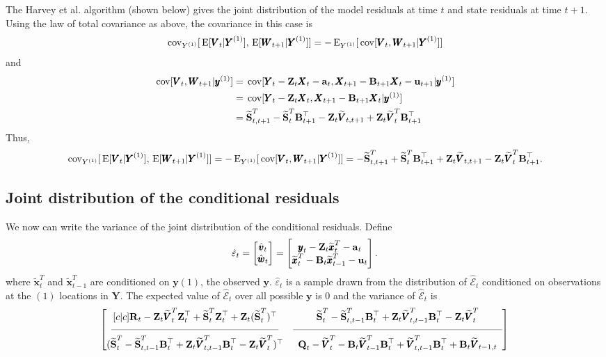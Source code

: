 \documentclass[]{article}
\def\UPS{\mbox{\boldmath $\Upsilon$}}
\def\XI{\mbox{\boldmath $\Xi$}}
\def\BB{\mbox{$\mathbf B$}}	\def\bb{\mbox{$\mathbf b$}} \def\Bb{\mbox{$\mathbf J$}} \def\Ba{\mbox{$\mathbf L$}} \def\Bm{\UPS}
\def\E{\,\textup{\textrm{E}}}
\def\QQ{\mbox{$\mathbf Q$}}	 \def\qq{\mbox{$\mathbf q$}} \def\Qb{\mbox{$\mathbf G$}}  \def\Qm{\mathbb{Q}}
\def\RR{\mbox{$\mathbf R$}}	 \def\rr{\mbox{$\mathbf r$}} \def\Rb{\mbox{$\mathbf H$}}	\def\Rm{\mathbb{R}}
\def\Ss{\mbox{$\mathbf S$}}
\def\VV{\mbox{$\pmb{V}$}}	\def\vv{\mbox{$\pmb{v}$}}
\def\WW{\mbox{$\pmb{W}$}}	\def\ww{\mbox{$\pmb{w}$}}
\def\XX{\mbox{$\pmb{X}$}}	\def\xx{\mbox{$\pmb{x}$}}
\def\YY{\mbox{$\pmb{Y}$}}	\def\yy{\mbox{$\pmb{y}$}}
\def\ZZ{\mbox{$\mathbf Z$}}	\def\zz{\mbox{$\mathbf z$}}	\def\Zb{\mbox{$\mathbf M$}} \def\Za{\mbox{$\mathbf N$}} \def\Zm{\XI}
\def\cov{\,\textup{\textrm{cov}}}
\def\hatxt{\widetilde{\xx}_t^T}
\def\hatxtm{\widetilde{\mbox{$\xx$}}_{t-1}^T}
\def\hatVt{\widetilde{\VV}_t^T}
\def\hatVtm{\widetilde{\VV}_{t-1}^T}
\def\hatVttm{\widetilde{\VV}_{t,t-1}^T}
\def\hatSt{\widetilde{\Ss}_t^T}
\def\hatSttm{\widetilde{\Ss}_t^{t-1}}
\def\hatSttm{\widetilde{\Ss}_{t,t-1}^T}
\def\hatSttp{\widetilde{\Ss}_{t,t+1}^T}
\begin{document}
The Harvey et al. algorithm (shown below) gives the joint distribution of the model residuals at time $t$ and state residuals at time $t+1$.  Using the law of total covariance as above, the covariance in this case is
\begin{equation}
\cov_{Y^{(1)}}[\E[\VV_t|\YY^{(1)}],\E[\WW_{t+1}|\YY^{(1)}]] = - \E_{Y^{(1)}}[ \cov[\VV_t, \WW_{t+1}|\YY^{(1)}] ] 
\end{equation}
and
\begin{equation}
\begin{split}
\cov[\VV_t, \WW_{t+1}|\yy^{(1)}] & =\cov[\YY_t-\ZZ_t\XX_t-\aa_t, \XX_{t+1}-\BB_{t+1}\XX_t-\uu_{t+1}|\yy^{(1)}] \\
& =\cov[\YY_t-\ZZ_t\XX_t, \XX_{t+1}-\BB_{t+1}\XX_t|\yy^{(1)}] \\
& = \hatSttp - \hatSt\BB_{t+1}^\top - \ZZ_t\widetilde{\VV}_{t,t+1} + \ZZ_t\hatVt\BB_{t+1}^\top
\end{split}
\end{equation}
Thus,
\begin{equation}
\cov_{Y^{(1)}}[\E[\VV_t|\YY^{(1)}],\E[\WW_{t+1}|\YY^{(1)}]] = - \E_{Y^{(1)}}[ \cov[\VV_t, \WW_{t+1}|\YY^{(1)}] ] = - \hatSttp + \hatSt\BB_{t+1}^\top + \ZZ_t\widetilde{\VV}_{t,t+1} - \ZZ_t\hatVt\BB_{t+1}^\top.
\end{equation}


\subsection{Joint distribution of the conditional residuals}
We now can write the variance of the joint distribution of the conditional residuals. Define
\begin{equation}
\hat{\varepsilon}_t = \begin{bmatrix}\hat{\vv}_t\\ \hat{\ww}_t\end{bmatrix} =
\begin{bmatrix}\yy_t - \ZZ_t\hatxt-\aa_t\\ \hatxt - \BB_t\hatxtm-\uu_t \end{bmatrix}.
\end{equation}
where $\hatxt$ and $\hatxtm$ are conditioned on $\yy{(1)}$, the observed $\yy$.
$\hat{\varepsilon}_t$ is a sample drawn from the distribution of $\hat{\mathcal{E}}_t$ conditioned on observations at the $(1)$ locations in $\YY$.  The expected value of $\hat{\mathcal{E}}_t$ over all possible $\yy$ is 0 and the variance of $\hat{\mathcal{E}}_t$  is
\begin{equation}\label{eqn:jointcondresid1general}
 \begin{bmatrix}[c|c]
 \RR_t - \ZZ_t \hatVt \ZZ_t^\top + \hatSt\ZZ_t^\top+\ZZ_t(\hatSt)^\top&
 \hatSt - \hatSttm\BB_t^\top  + \ZZ_t\hatVttm\BB_t^\top - \ZZ_t\hatVt \\
 \rule[.5ex]{40ex}{0.25pt} & \rule[.5ex]{50ex}{0.25pt} \\
 (\hatSt - \hatSttm\BB_t^\top  + \ZZ_t\hatVttm\BB_t^\top - \ZZ_t\hatVt)^\top& 
 \QQ_t - \hatVt - \BB_t \hatVtm \BB_t^\top + \hatVttm \BB_t^\top + \BB_t\widetilde{\VV}_{t-1,t} \end{bmatrix}
\end{equation}
\end{document}
